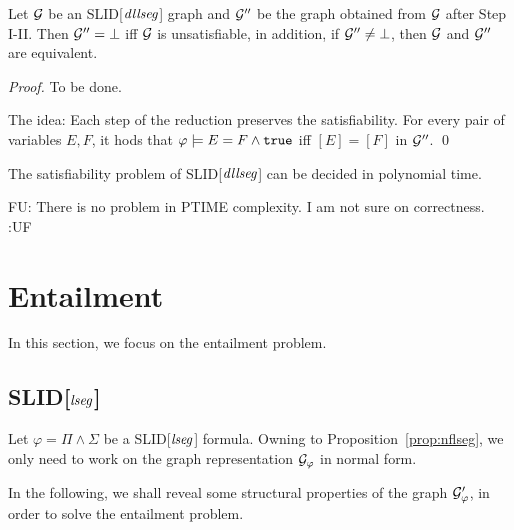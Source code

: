 \documentclass{llncs}
\newcommand{\fu}[1]{\color{purple} {FU: #1 :UF} \color{black}}
\begin{document}


\begin{proposition} \label{prop:nfdllseg}
Let $\mathcal{G}$ be an SLID[$\mathit{dllseg}$] graph and $\mathcal{G}''$ be the graph obtained from $\mathcal{G}$ after Step I-II.  Then $\mathcal{G}'' = \bot$ iff $\mathcal{G}$ is unsatisfiable, in addition, if $\mathcal{G}''  \neq \bot$, then $\mathcal{G}$ and $\mathcal{G}''$ are equivalent. 
\end{proposition}

\begin{proof}
To be done.

The idea: Each step of the reduction preserves the satisfiability. For every pair of variables $E,F$, it hods that $\varphi \models E = F \wedge \mathtt{true}$ iff $[E]=[F]$ in $\mathcal{G}''$.
\qed
\end{proof}




\begin{theorem}
The satisfiability problem of SLID[$\mathit{dllseg}$] can be decided in polynomial time.
\end{theorem}

\fu{There is no problem in PTIME complexity. I am not sure on correctness.}
\section{Entailment}

In this section, we focus on the entailment problem.
\subsection{SLID[$\mathit{lseg}$]}


Let $\varphi = \Pi \wedge \Sigma$ be a SLID[$\mathit{lseg}$] formula. Owning to Proposition~\ref{prop:nflseg}, we only need to work on the graph representation $\mathcal{G}_\varphi$ in  normal form.

In the following, we shall reveal some structural properties of the graph $\mathcal{G}'_\varphi$, in order to solve the entailment problem.
\end{document}
